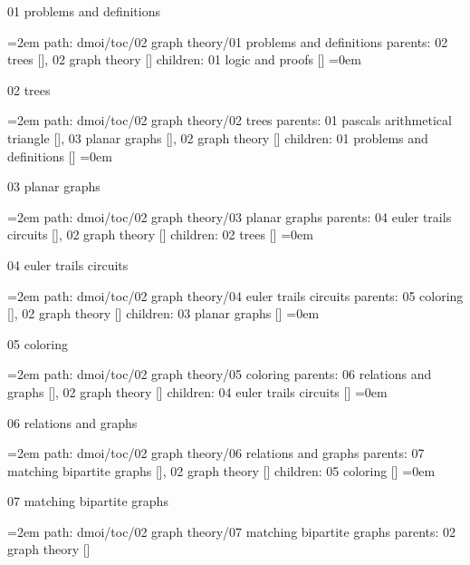 \bigskip
{}
01 problems and definitions
\smallskip
\par\begingroup
\leftskip=2em
path: dmoi/toc/02 graph theory/01 problems and definitions
\smallskip
parents:  02 trees [], 02 graph theory []
\smallskip
children: 01 logic and proofs []
\smallskip
\leftskip=0em
\par\endgroup
\bigskip
{}
02 trees
\smallskip
\par\begingroup
\leftskip=2em
path: dmoi/toc/02 graph theory/02 trees
\smallskip
parents:  01 pascals arithmetical triangle [], 03 planar graphs [], 02 graph theory []
\smallskip
children: 01 problems and definitions []
\smallskip
\leftskip=0em
\par\endgroup
\bigskip
{}
03 planar graphs
\smallskip
\par\begingroup
\leftskip=2em
path: dmoi/toc/02 graph theory/03 planar graphs
\smallskip
parents:  04 euler trails circuits [], 02 graph theory []
\smallskip
children: 02 trees []
\smallskip
\leftskip=0em
\par\endgroup
\bigskip
{}
04 euler trails circuits
\smallskip
\par\begingroup
\leftskip=2em
path: dmoi/toc/02 graph theory/04 euler trails circuits
\smallskip
parents:  05 coloring [], 02 graph theory []
\smallskip
children: 03 planar graphs []
\smallskip
\leftskip=0em
\par\endgroup
\bigskip
{}
05 coloring
\smallskip
\par\begingroup
\leftskip=2em
path: dmoi/toc/02 graph theory/05 coloring
\smallskip
parents:  06 relations and graphs [], 02 graph theory []
\smallskip
children: 04 euler trails circuits []
\smallskip
\leftskip=0em
\par\endgroup
\bigskip
{}
06 relations and graphs
\smallskip
\par\begingroup
\leftskip=2em
path: dmoi/toc/02 graph theory/06 relations and graphs
\smallskip
parents:  07 matching bipartite graphs [], 02 graph theory []
\smallskip
children: 05 coloring []
\smallskip
\leftskip=0em
\par\endgroup
\bigskip
{}
07 matching bipartite graphs
\smallskip
\par\begingroup
\leftskip=2em
path: dmoi/toc/02 graph theory/07 matching bipartite graphs
\smallskip
parents:  02 graph theory []
